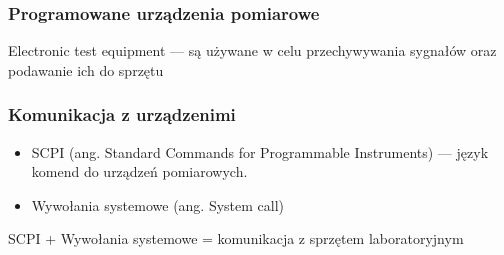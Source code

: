 \documentclass[xcolor={dvipsnames,table}]{beamer}
\begin{document}
\begin{frame}
\frametitle{Programowane urządzenia pomiarowe}
Electronic test equipment --- są używane w celu przechywywania sygnałów oraz podawanie ich do sprzętu
\end{frame}

\begin{frame}
\frametitle{Komunikacja z urządzenimi}
\begin{itemize}
\item SCPI (ang. Standard Commands for Programmable Instruments) --- język komend do urządzeń pomiarowych.
\item Wywołania systemowe (ang. System call)
\end{itemize}
SCPI + Wywołania systemowe = komunikacja z sprzętem laboratoryjnym
\end{frame}
\end{document}
